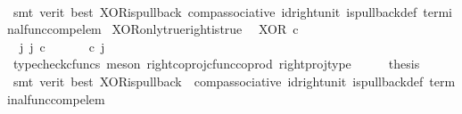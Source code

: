 \begin{isabellebody}
\ \ \ \ \isamarkupfalse%
\ {\isacharparenleft}{\kern0pt}smt\ {\isacharparenleft}{\kern0pt}verit{\isacharcomma}{\kern0pt}\ best{\isacharparenright}{\kern0pt}\ XOR{\isacharunderscore}{\kern0pt}is{\isacharunderscore}{\kern0pt}pullback\ comp{\isacharunderscore}{\kern0pt}associative{}\ id{\isacharunderscore}{\kern0pt}right{\isacharunderscore}{\kern0pt}unit{}\ is{\isacharunderscore}{\kern0pt}pullback{\isacharunderscore}{\kern0pt}def\ terminal{\isacharunderscore}{\kern0pt}func{\isacharunderscore}{\kern0pt}comp{\isacharunderscore}{\kern0pt}elem{\isacharparenright}{\kern0pt}\isanewline
{}\isamarkupfalse%
%
\endisatagproof
{\isafoldproof}%
%
\isadelimproof
\isanewline
%
\endisadelimproof
\isanewline
{}\isamarkupfalse%
\ XOR{\isacharunderscore}{\kern0pt}only{\isacharunderscore}{\kern0pt}true{\isacharunderscore}{\kern0pt}right{\isacharunderscore}{\kern0pt}is{\isacharunderscore}{\kern0pt}true{\isacharcolon}{\kern0pt}\isanewline
\ \ {\isachardoublequoteopen}XOR\ {\isasymcirc}\isactrlsub c\ \ {\isasymlangle}{\isasymf}{\isacharcomma}{\kern0pt}{\isasymt}{\isasymrangle}\ {\isacharequal}{\kern0pt}\ {\isasymt}{\isachardoublequoteclose}\isanewline
%
\isadelimproof
%
\endisadelimproof
%
\isatagproof
{}\isamarkupfalse%
\ {\isacharminus}{\kern0pt}\ \ \ \isanewline
\ \ \isamarkupfalse%
\ {\isachardoublequoteopen}{\isasymexists}\ j{\isachardot}{\kern0pt}\ j\ {\isasymin}\isactrlsub c\ {\isasymone}{\isasymCoprod}{\isasymone}\ {\isasymand}\ {\isacharparenleft}{\kern0pt}{\isasymlangle}{\isasymt}{\isacharcomma}{\kern0pt}\ {\isasymf}{\isasymrangle}\ {\isasymamalg}{\isasymlangle}{\isasymf}{\isacharcomma}{\kern0pt}\ {\isasymt}{\isasymrangle}{\isacharparenright}{\kern0pt}\ {\isasymcirc}\isactrlsub c\ j\ \ {\isacharequal}{\kern0pt}\ {\isasymlangle}{\isasymf}{\isacharcomma}{\kern0pt}{\isasymt}{\isasymrangle}{\isachardoublequoteclose}\isanewline
\ \ \ \ \isamarkupfalse%
\ {\isacharparenleft}{\kern0pt}typecheck{\isacharunderscore}{\kern0pt}cfuncs{\isacharcomma}{\kern0pt}\ meson\ right{\isacharunderscore}{\kern0pt}coproj{\isacharunderscore}{\kern0pt}cfunc{\isacharunderscore}{\kern0pt}coprod\ right{\isacharunderscore}{\kern0pt}proj{\isacharunderscore}{\kern0pt}type{\isacharparenright}{\kern0pt}\isanewline
\ \ \isamarkupfalse%
\ \isamarkupfalse%
\ {\isacharquery}{\kern0pt}thesis\isanewline
\ \ \ \ \isamarkupfalse%
\ {\isacharparenleft}{\kern0pt}smt\ {\isacharparenleft}{\kern0pt}verit{\isacharcomma}{\kern0pt}\ best{\isacharparenright}{\kern0pt}\ XOR{\isacharunderscore}{\kern0pt}is{\isacharunderscore}{\kern0pt}pullback\ \ comp{\isacharunderscore}{\kern0pt}associative{}\ id{\isacharunderscore}{\kern0pt}right{\isacharunderscore}{\kern0pt}unit{}\ is{\isacharunderscore}{\kern0pt}pullback{\isacharunderscore}{\kern0pt}def\ terminal{\isacharunderscore}{\kern0pt}func{\isacharunderscore}{\kern0pt}comp{\isacharunderscore}{\kern0pt}elem{\isacharparenright}{\kern0pt}\isanewline

\end{isabellebody}
